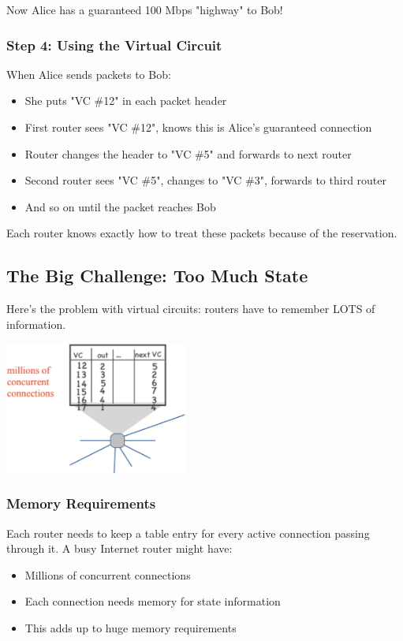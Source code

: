\documentclass[../../compsys.tex]{subfiles}
\begin{document}
Now Alice has a guaranteed 100 Mbps "highway" to Bob!

\subsubsection{Step 4: Using the Virtual Circuit}
When Alice sends packets to Bob:
\begin{itemize}
    \item She puts "VC \#12" in each packet header
    \item First router sees "VC \#12", knows this is Alice's guaranteed connection
    \item Router changes the header to "VC \#5" and forwards to next router
    \item Second router sees "VC \#5", changes to "VC \#3", forwards to third router
    \item And so on until the packet reaches Bob
\end{itemize}

Each router knows exactly how to treat these packets because of the reservation.

\subsection{The Big Challenge: Too Much State}
Here's the problem with virtual circuits: routers have to remember LOTS of information.

\begin{center}
    \includegraphics[width=0.45\textwidth]{images/vc-state.png}
\end{center}

\subsubsection{Memory Requirements}
Each router needs to keep a table entry for every active connection passing through it. A busy Internet router might have:
\begin{itemize}
    \item Millions of concurrent connections
    \item Each connection needs memory for state information
    \item This adds up to huge memory requirements
\end{itemize}
\newpage
\end{document}
